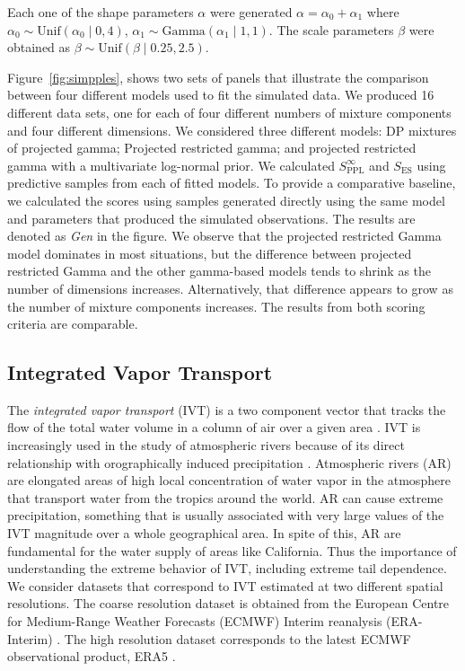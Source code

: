 Each one of the shape parameters $\alpha$ were generated 
$\alpha = \alpha_0 + \alpha_1$ where
  $\alpha_0 \sim \text{Unif}(\alpha_0\mid 0,4)$, $\alpha_1\sim \text{Gamma}(\alpha_1\mid 1,1)$.
The scale parameters $\beta$ were obtained as $\beta\sim\text{Unif}(\beta\mid 0.25, 2.5)$.

Figure~\ref{fig:simpples}, shows two sets of panels that illustrate the comparison
between four different models used to fit the simulated data. We produced 16 
different data sets, one for each of four different numbers of mixture components 
and four different dimensions. We considered three different models: DP mixtures 
of projected gamma; Projected restricted gamma; and projected restricted gamma 
with a multivariate log-normal prior. We calculated $S^\infty_{\text{PPL}}$ and 
$S_{\text{ES}}$ using predictive samples from each of fitted models. To provide 
a comparative baseline, we calculated the scores using samples generated 
directly using the same model and parameters that produced the simulated 
observations. The results are denoted as \emph{Gen} in the figure. 
We observe that the projected
  restricted Gamma model dominates in most situations, but the difference between projected restricted
  Gamma and the other gamma-based models tends to shrink as the number of dimensions increases.
  Alternatively, that difference appears to grow as the number of mixture components increases. 
  The results from both scoring criteria are comparable.

\subsection{Integrated Vapor Transport\label{subsec:ivt}}
The \emph{integrated vapor transport} (IVT) is a two component vector 
that tracks the flow of the total water volume in a column of air 
over a given area \citep{ralph2017}.  IVT is increasingly used in the study of atmospheric rivers because of its direct 
relationship with orographically induced precipitation
\citep{neiman2009water}. Atmospheric rivers (AR) are elongated areas of high 
local concentration of water vapor in the atmosphere that transport water
from the tropics around the world. AR can cause extreme 
precipitation,  something that is usually associated with very large values
of the IVT magnitude over a whole geographical area. In spite of this, AR
are fundamental for the water supply of areas like California. Thus the
importance of understanding the extreme behavior of IVT, including 
extreme tail dependence. We consider datasets that correspond to IVT
estimated at two different spatial resolutions. The coarse resolution dataset
is obtained from the European Centre for Medium-Range Weather Forecasts
(ECMWF) Interim reanalysis (ERA-Interim) \citep{berrisford2011atmospheric,dee2011era}. 
The high resolution dataset corresponds to the latest ECMWF 
observational product, ERA5  \citep{hersbach2020era5}. 

